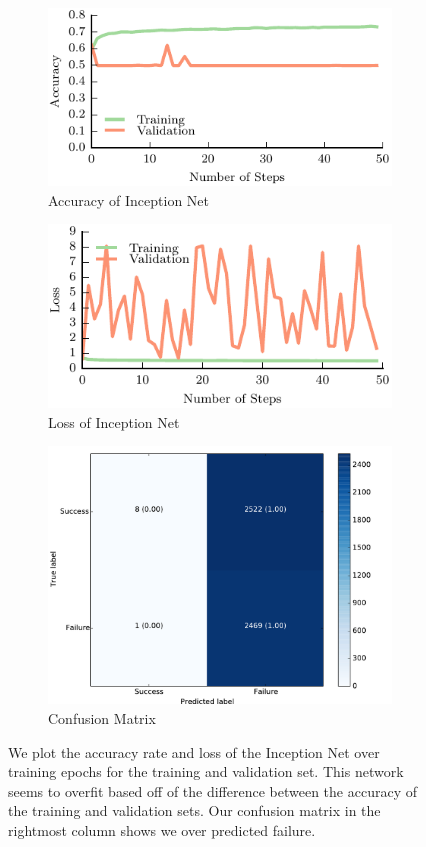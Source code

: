 \begin{figure}[t!]
    \centering
    \begin{subfigure}[t]{0.32\textwidth}
        \includegraphics[width=0.9\columnwidth]{figs/inception_accuracy.pdf}
        \caption{Accuracy of Inception Net} \label{fig:accuracy}
        \end{subfigure}
    \begin{subfigure}[t]{0.32\textwidth}
        \includegraphics[width=0.9\columnwidth]{figs/inception_loss.pdf}
        \caption{Loss of Inception Net} \label{fig:loss_inception}
    \end{subfigure}
		\begin{subfigure}[t]{0.32\textwidth}
        \includegraphics[width=0.8\columnwidth]{figs/confusion_inception.pdf}
        \caption{Confusion Matrix} \label{fig:confusion_inception}
    \end{subfigure}
\caption{We plot the accuracy rate and loss of the Inception Net over training epochs for the training and validation set. This network seems to overfit based off of the difference between the accuracy of the training and validation sets. Our confusion matrix in the rightmost column shows we over predicted failure.} \label{fig:inceptionnet_results}
\end{figure}

